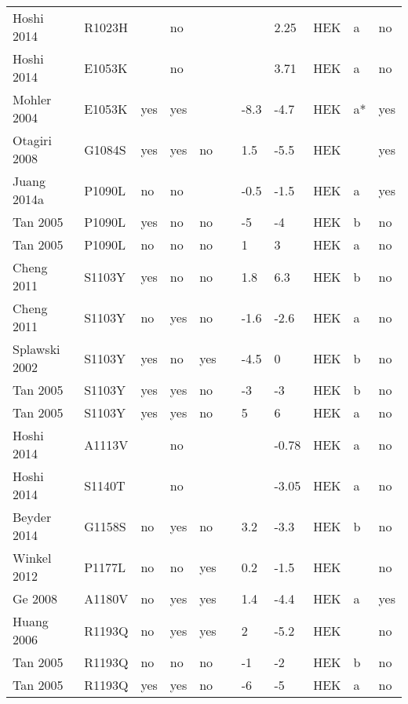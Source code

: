 \begin{tiny}
\begin{longtable}{p{4cm}|l|llll|ll|lll}
Hoshi 2014\cite{Hoshi2014MutationDB} & R1023H &  & no &  &  &  & 2.25 & HEK & a & no \\
Hoshi 2014\cite{Hoshi2014MutationDB} & E1053K &  & no &  &  &  & 3.71 & HEK & a & no \\
Mohler 2004\cite{Mohler2004MutationDB} & E1053K & yes & yes &  &  & -8.3 & -4.7 & HEK & a* & yes \\
Otagiri 2008\cite{Otagiri2008MutationDB} & G1084S & yes & yes & no &  & 1.5 & -5.5 & HEK &  & yes \\
Juang 2014a\cite{Juang2014aMutationDB} & P1090L & no & no &  &  & -0.5 & -1.5 & HEK & a & yes \\
Tan 2005\cite{Tan2005MutationDB} & P1090L & yes & no & no &  & -5 & -4 & HEK & b & no \\
Tan 2005\cite{Tan2005MutationDB} & P1090L & no & no & no &  & 1 & 3 & HEK & a & no \\
Cheng 2011\cite{Cheng2011MutationDB} & S1103Y & yes & no & no &  & 1.8 & 6.3 & HEK & b & no \\
Cheng 2011\cite{Cheng2011MutationDB} & S1103Y & no & yes & no &  & -1.6 & -2.6 & HEK & a & no \\
Splawski 2002\cite{Splawski2002MutationDB} & S1103Y & yes & no & yes &  & -4.5 & 0 & HEK & b & no \\
Tan 2005\cite{Tan2005MutationDB} & S1103Y & yes & yes & no &  & -3 & -3 & HEK & b & no \\
Tan 2005\cite{Tan2005MutationDB} & S1103Y & yes & yes & no &  & 5 & 6 & HEK & a & no \\
Hoshi 2014\cite{Hoshi2014MutationDB} & A1113V &  & no &  &  &  & -0.78 & HEK & a & no \\
Hoshi 2014\cite{Hoshi2014MutationDB} & S1140T &  & no &  &  &  & -3.05 & HEK & a & no \\
Beyder 2014\cite{Beyder2014MutationDB} & G1158S & no & yes & no &  & 3.2 & -3.3 & HEK & b & no \\
Winkel 2012\cite{Winkel2012MutationDB} & P1177L & no & no & yes &  & 0.2 & -1.5 & HEK &  & no \\
Ge 2008\cite{Ge2008MutationDB} & A1180V & no & yes & yes &  & 1.4 & -4.4 & HEK & a & yes \\
Huang 2006\cite{Huang2006MutationDB} & R1193Q & no & yes & yes &  & 2 & -5.2 & HEK &  & no \\
Tan 2005\cite{Tan2005MutationDB} & R1193Q & no & no & no &  & -1 & -2 & HEK & b & no \\
Tan 2005\cite{Tan2005MutationDB} & R1193Q & yes & yes & no &  & -6 & -5 & HEK & a & no \\

\end{longtable}
\end{tiny}
